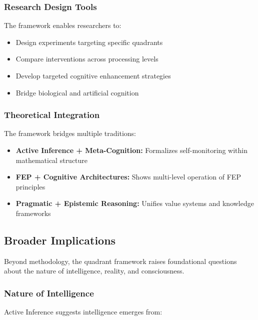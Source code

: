 \documentclass[
]{article}
\providecommand{\tightlist}{%
  \setlength{\itemsep}{0pt}\setlength{\parskip}{0pt}}
\begin{document}
\subsubsection{Research Design Tools}\label{research-design-tools}

The framework enables researchers to:

\begin{itemize}
\tightlist
\item
  Design experiments targeting specific quadrants
\item
  Compare interventions across processing levels
\item
  Develop targeted cognitive enhancement strategies
\item
  Bridge biological and artificial cognition
\end{itemize}

\subsubsection{Theoretical Integration}\label{theoretical-integration}

The framework bridges multiple traditions:

\begin{itemize}
\tightlist
\item
  \textbf{Active Inference + Meta-Cognition:} Formalizes self-monitoring
  within mathematical structure
\item
  \textbf{FEP + Cognitive Architectures:} Shows multi-level operation of
  FEP principles
\item
  \textbf{Pragmatic + Epistemic Reasoning:} Unifies value systems and
  knowledge frameworks
\end{itemize}

\subsection{Broader Implications}\label{sec:broader_implications}

Beyond methodology, the quadrant framework raises foundational questions
about the nature of intelligence, reality, and consciousness.

\subsubsection{Nature of Intelligence}\label{nature-of-intelligence}

Active Inference suggests intelligence emerges from:
\end{document}
